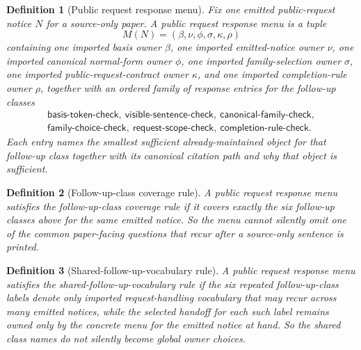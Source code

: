 \documentclass[11pt]{article}
\newtheorem{definition}{Definition}
\begin{document}
\begin{definition}[Public request response menu]
Fix one emitted public-request notice $N$ for a source-only paper.
A \emph{public request response menu} is a tuple
\[
M(N)=(\beta,\nu,\phi,\sigma,\kappa,\rho)
\]
containing one imported basis owner $\beta$, one imported emitted-notice owner $\nu$, one imported canonical normal-form owner $\phi$, one imported family-selection owner $\sigma$, one imported public-request-contract owner $\kappa$, and one imported completion-rule owner $\rho$, together with an ordered family of response entries for the follow-up classes
\[
\begin{array}{l}
\textsf{basis-token-check},\ \textsf{visible-sentence-check},\ \textsf{canonical-family-check},\\
\textsf{family-choice-check},\ \textsf{request-scope-check},\ \textsf{completion-rule-check}.
\end{array}
\]
Each entry names the smallest sufficient already-maintained object for that follow-up class together with its canonical citation path and why that object is sufficient.
\end{definition}

\begin{definition}[Follow-up-class coverage rule]
A public request response menu satisfies the \emph{follow-up-class coverage rule} if it covers exactly the six follow-up classes above for the same emitted notice.
So the menu cannot silently omit one of the common paper-facing questions that recur after a source-only sentence is printed.
\end{definition}

\begin{definition}[Shared-follow-up-vocabulary rule]
A public request response menu satisfies the \emph{shared-follow-up-vocabulary rule} if the six repeated follow-up-class labels denote only imported request-handling vocabulary that may recur across many emitted notices, while the selected handoff for each such label remains owned only by the concrete menu for the emitted notice at hand.
So the shared class names do not silently become global owner choices.
\end{definition}
\end{document}

